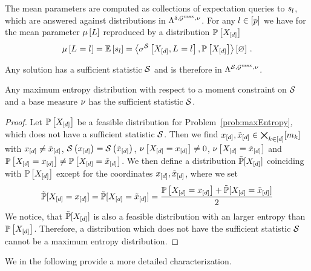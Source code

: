 The mean parameters are computed as collections of expectation queries to $s_{l}$, which are answered against distributions in $\Lambda^{\delta,\mathcal{G}^{\mathrm{max}},\nu}$.
For any $l\in[p]$ we have for the mean parameter $\mu\left[L\right]$ reproduced by a distribution $\mathbb{P}\left[X_{[d]}\right]$
\begin{align*}
    \mu\left[L_{}=l_{}\right]
    = \mathbb{E}\left[s_{l}\right]
    = \left\langle \sigma^{\mathcal{S}}\left[X_{[d]},L_{}=l_{}\right],\mathbb{P}\left[X_{[d]}\right]\right\rangle \left[ \varnothing \right] \, .
\end{align*}

Any solution has a sufficient statistic $\mathcal{S}$ and is therefore in $\Lambda^{\mathcal{S},\mathcal{G}^{\mathrm{max}},\nu}$.

\begin{theorem}\label{the:maxEntWithSufficientStatistic}
    Any maximum entropy distribution with respect to a moment constraint on $\mathcal{S}$ and a base measure $\nu$ has the sufficient statistic $\mathcal{S}$.
\end{theorem}
\begin{proof}
    Let $\mathbb{P}\left[X_{[d]}\right]$ be a feasible distribution for Problem~\eqref{prob:maxEntropy}, which does not have a sufficient statistic $\mathcal{S}$.
    Then we find $x_{[d]},\tilde{x}_{[d]}\in\bigtimes_{k\in[d]}[m_{k}]$ with $x_{[d]}\neq\tilde{x}_{[d]}$, $\mathcal{S}\left(x_{[d]}\right)=\mathcal{S}\left(\tilde{x}_{[d]}\right)$, $\nu\left[X_{[d]}=x_{[d]}\right]\neq0$, $\nu\left[X_{[d]}=\tilde{x}_{[d]}\right]$ and $\mathbb{P}\left[X_{[d]}=x_{[d]}\right]\neq\mathbb{P}\left[X_{[d]}=\tilde{x}_{[d]}\right]$.
    We then define a distribution $\tilde{\mathbb{P}}[X_{[d]}]$ coinciding with $\mathbb{P}\left[X_{[d]}\right]$ except for the coordinates $x_{[d]},\tilde{x}_{[d]}$, where we set
    \begin{align*}
        \tilde{\mathbb{P}}[X_{[d]}=x_{[d]}] = \tilde{\mathbb{P}}[X_{[d]}=\tilde{x}_{[d]}] = \frac{\mathbb{P}\left[X_{[d]}=x_{[d]}\right]+\tilde{\mathbb{P}}[X_{[d]}=\tilde{x}_{[d]}]}{2}
    \end{align*}
    We notice, that $\tilde{\mathbb{P}}[X_{[d]}]$ is also a feasible distribution with an larger entropy than $\mathbb{P}\left[X_{[d]}\right]$.
    Therefore, a distribution which does not have the sufficient statistic $\mathcal{S}$ cannot be a maximum entropy distribution.
\end{proof}

We in the following provide a more detailed characterization.


